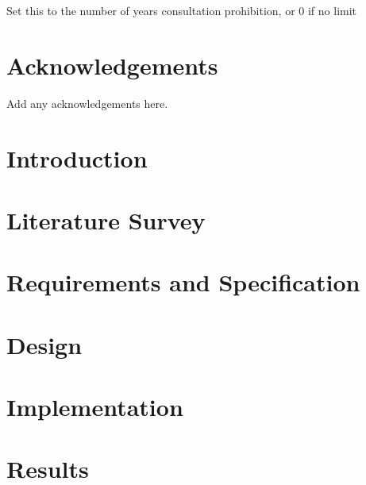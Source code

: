 
\maketitle
\newpage
 Set this to the number of years consultation prohibition, or 0 if no limit
\newpage


\declaration{\disstitle}{\authorname} %
\newpage


\abstract

\newpage


\tableofcontents
\newpage
\listoffigures
\newpage
\listoftables
\newpage

\chapter*{Acknowledgements}
Add any acknowledgements here.
\newpage

\listoftodos

\setcounter{page}{1}



\chapter{Introduction}

\chapter{Literature Survey}


\chapter{Requirements and Specification}


\chapter{Design}


\chapter{Implementation}


\chapter{Results}


